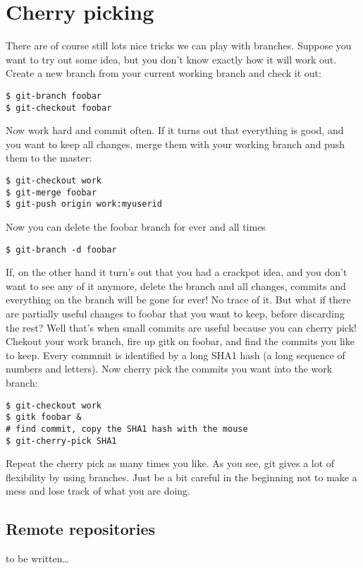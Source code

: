 \documentclass[a4paper,10pt]{article}
\begin{document}
\section{Cherry picking}
There are of course still lots nice tricks we can play with
branches. Suppose you want to try out some idea, but you don't know exactly
how it will work out. Create a new branch from your current working branch and
check it out:
\begin{verbatim}
$ git-branch foobar
$ git-checkout foobar
\end{verbatim}
Now work hard and commit often. If it turns out that everything is good, and
you want to keep all changes, merge them with your working branch and push
them to the master:
\begin{verbatim}
$ git-checkout work
$ git-merge foobar
$ git-push origin work:myuserid
\end{verbatim}
Now you can delete the foobar branch for ever and all times
\begin{verbatim}
$ git-branch -d foobar
\end{verbatim}
If, on the other hand it turn's out that you had a crackpot idea, and you
don't want to see any of it anymore, delete the branch and all changes,
commits and everything on the branch will be gone for ever! No trace of it.
But what if there are partially useful changes to foobar that you want to
keep, before discarding the rest? Well that's when small commits are useful
because you can cherry pick! Chekout your work branch, fire up gitk on foobar,
and find the commits you like to keep. Every commmit is identified by a long
SHA1 hash (a long sequence of numbers and letters). Now cherry pick the
commits you want into the work branch:
\begin{verbatim}
$ git-checkout work
$ gitk foobar &
# find commit, copy the SHA1 hash with the mouse
$ git-cherry-pick SHA1
\end{verbatim}
Repeat the cherry pick as many times you like. As you see, git gives a lot of
flexibility by using branches. Just be a bit careful in the beginning not to
make a mess and lose track of what you are doing. 

\subsection{Remote repositories}
to be written\ldots
\end{document}
